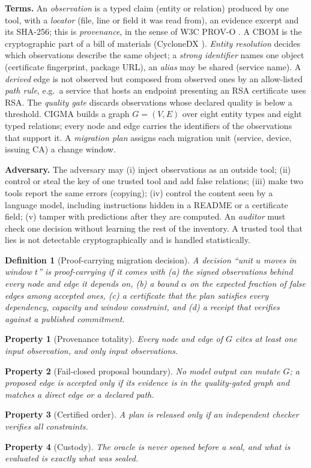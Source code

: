 \documentclass[a4paper,twoside]{article}
\newcommand{\cigma}{CIGMA\xspace}
\newtheorem{definition}{Definition}
\newtheorem{property}{Property}
\begin{document}
\textbf{Terms.} An \emph{observation} is a typed claim (entity or relation) produced by one tool, with a \emph{locator} (file, line or field it was read from), an evidence excerpt and its SHA-256; this is \emph{provenance}, in the sense of W3C PROV-O \cite{w3c2013provo}. A CBOM is the cryptographic part of a bill of materials (CycloneDX \cite{cyclonedx2024cbom}). \emph{Entity resolution} decides which observations describe the same object; a \emph{strong identifier} names one object (certificate fingerprint, package URL), an \emph{alias} may be shared (service name). A \emph{derived} edge is not observed but composed from observed ones by an allow-listed \emph{path rule}, e.g.\ a service that hosts an endpoint presenting an RSA certificate uses RSA. The \emph{quality gate} discards observations whose declared quality is below a threshold. \cigma builds a graph $G=(V,E)$ over eight entity types and eight typed relations; every node and edge carries the identifiers of the observations that support it. A \emph{migration plan} assigns each migration unit (service, device, issuing CA) a change window.

\textbf{Adversary.} The adversary may (i) inject observations as an outside tool; (ii) control or steal the key of one trusted tool and add false relations; (iii) make two tools report the same errors (copying); (iv) control the content seen by a language model, including instructions hidden in a README or a certificate field; (v) tamper with predictions after they are computed. An \emph{auditor} must check one decision without learning the rest of the inventory. A trusted tool that lies is not detectable cryptographically and is handled statistically.

\begin{definition}[Proof-carrying migration decision]\label{def:pcm}
A decision ``unit $u$ moves in window $t$'' is proof-carrying if it comes with (a) the signed observations behind every node and edge it depends on, (b) a bound $\alpha$ on the expected fraction of false edges among accepted ones, (c) a certificate that the plan satisfies every dependency, capacity and window constraint, and (d) a receipt that verifies against a published commitment.
\end{definition}

\begin{property}[Provenance totality]\label{p:prov} Every node and edge of $G$ cites at least one input observation, and only input observations.\end{property}
\begin{property}[Fail-closed proposal boundary]\label{p:fail} No model output can mutate $G$; a proposed edge is accepted only if its evidence is in the quality-gated graph and matches a direct edge or a declared path.\end{property}
\begin{property}[Certified order]\label{p:cert} A plan is released only if an independent checker verifies all constraints.\end{property}
\begin{property}[Custody]\label{p:custody} The oracle is never opened before a seal, and what is evaluated is exactly what was sealed.\end{property}
\end{document}
